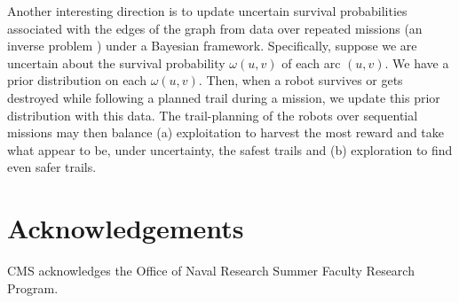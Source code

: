 \documentclass[fleqn,10pt,lineno]{wlpeerj}
\begin{document}
Another interesting direction is to update uncertain survival probabilities associated with the edges of the graph from data over repeated missions (an inverse problem \cite{burton1992instance}) under a Bayesian framework. 
Specifically, suppose we are uncertain about the survival probability $\omega(u, v)$ of each arc $(u,v)$. We have a prior distribution on each $\omega(u,v)$. Then, when a robot survives or gets destroyed while following a planned trail during a mission, we update this prior distribution with this data. 
The trail-planning of the robots over sequential missions may then balance (a) exploitation to harvest the most reward and take what appear to be, under uncertainty, the safest trails and (b) exploration to find even safer trails.

\section*{Acknowledgements} CMS acknowledges the Office of Naval Research Summer Faculty Research Program.



\end{document}
